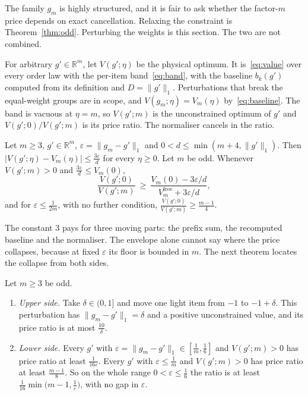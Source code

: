 The family $g_{m}$ is highly structured, and it is fair to ask whether the factor-$m$ price
depends on exact cancellation. Relaxing the constraint is Theorem~\ref{thm:odd}. Perturbing
the weights is this section. The two are not combined.

For arbitrary $g'\in\mathbb{R}^{m}$, let $V(g';\eta)$ be the physical optimum. It
is~\eqref{eq:value} over every order law with the per-item band~\eqref{eq:band}, with the
baseline $b_{k}(g')$ computed from its definition and $D=\|g'\|_{1}$. Perturbations that break
the equal-weight groups are in scope, and $V(g_{m};\eta)=V_{m}(\eta)$
by~\eqref{eq:baseline}. The band is vacuous at $\eta=m$, so $V(g';m)$ is the unconstrained
optimum of $g'$ and $V(g';0)/V(g';m)$ is its price ratio. The normaliser cancels in the
ratio.

\begin{theorem}[Envelope]
\label{thm:robust}
Let $m\ge3$, $g'\in\mathbb{R}^{m}$, $\varepsilon=\|g_{m}-g'\|_{1}$ and
$0<d\le\min(m+4,\|g'\|_{1})$. Then $|V(g';\eta)-V_{m}(\eta)|\le\frac{3\varepsilon}{d}$ for
every $\eta\ge0$. Let $m$ be odd. Whenever $V(g';m)>0$ and $\frac{3\varepsilon}{d}\le V_{m}(0)$,
\[
\frac{V(g';0)}{V(g';m)}\ \ge\ \frac{V_{m}(0)-3\varepsilon/d}{V^{\mathrm{free}}_{m}+3\varepsilon/d},
\]
and for $\varepsilon\le\frac{1}{2m}$, with no further condition,
$\frac{V(g';0)}{V(g';m)}\ge\frac{m-1}{4}$.
\end{theorem}


The constant $3$ pays for three moving parts: the prefix sum, the recomputed baseline and the
normaliser. The envelope alone cannot say where the price collapses, because at fixed
$\varepsilon$ its floor is bounded in $m$. The next theorem locates the collapse from both
sides.

\begin{theorem}
\label{thm:collapse}
Let $m\ge3$ be odd.
\begin{enumerate}
\item[(a)] \emph{Upper side.} Take $\delta\in(0,1]$ and move one light item from $-1$ to
$-1+\delta$. This perturbation has $\|g_{m}-g'\|_{1}=\delta$ and a positive unconstrained
value, and its price ratio is at most $\frac{10}{\delta}$.
\item[(b)] \emph{Lower side.} Every $g'$ with $\varepsilon=\|g_{m}-g'\|_{1}\in[\frac1m,\frac16]$
and $V(g';m)>0$ has price ratio at least $\frac{1}{16\varepsilon}$. Every $g'$ with
$\varepsilon\le\frac1m$ and $V(g';m)>0$ has price ratio at least $\frac{m-1}{8}$. So on the
whole range $0<\varepsilon\le\frac16$ the ratio is at least
$\frac1{16}\min\bigl(m-1,\frac1\varepsilon\bigr)$, with no gap in $\varepsilon$.
\end{enumerate}
\end{theorem}

